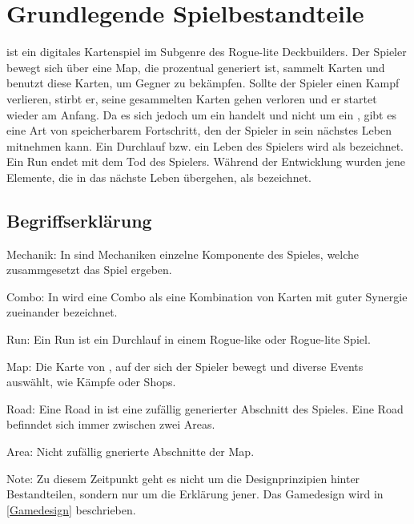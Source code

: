 
\section{Grundlegende Spielbestandteile}\label{sec:grundlegenste-regeln}

\renewcommand{\kapitelautor}{Autor: Philip Jankovic}





%
\FF ist ein digitales Kartenspiel im Subgenre des Rogue-lite Deckbuilders.
Der Spieler bewegt sich über eine Map, die prozentual generiert ist, sammelt Karten und benutzt diese Karten,
um Gegner zu bekämpfen. Sollte der Spieler einen Kampf verlieren, stirbt er, seine gesammelten Karten
gehen verloren und er startet wieder am Anfang. Da es sich jedoch um ein  handelt und nicht um ein ,
gibt es eine Art von speicherbarem Fortschritt, den der Spieler in sein nächstes Leben mitnehmen kann.
Ein Durchlauf bzw. ein Leben des Spielers wird als  bezeichnet. Ein Run endet mit dem Tod des Spielers.
Während der Entwicklung wurden jene Elemente, die in das nächste Leben übergehen, als  bezeichnet.


\subsection{Begriffserklärung}\label{rogue_lite_elemente}
Mechanik: In \FF sind Mechaniken einzelne Komponente des Spieles, welche zusammgesetzt das Spiel ergeben.

Combo: In \FF wird eine Combo als eine Kombination von Karten mit guter Synergie zueinander bezeichnet.

Run: Ein Run ist ein Durchlauf in einem Rogue-like oder Rogue-lite Spiel. 

Map: Die Karte von \FF, auf der sich der Spieler bewegt und diverse Events auswählt, wie \zB Kämpfe oder Shops.

Road: Eine Road in \FF ist eine zufällig generierter Abschnitt des Spieles. Eine Road befinndet sich immer zwischen zwei Areas.

Area: Nicht zufällig gnerierte Abschnitte der \FF Map.

\begin{infoBox}
    Note: Zu diesem Zeitpunkt geht es nicht um die Designprinzipien hinter Bestandteilen,
    sondern nur um die Erklärung jener. Das Gamedesign wird in \ref{Gamedesign} beschrieben.
\end{infoBox}


